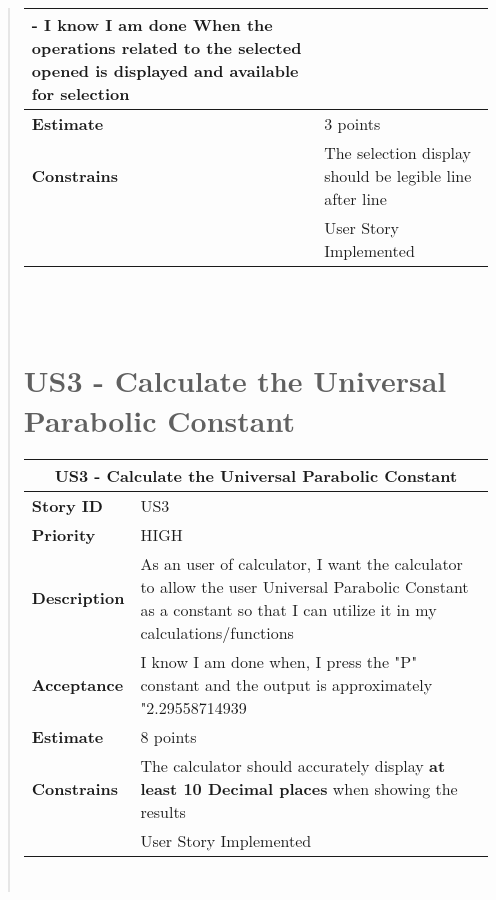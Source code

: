 \documentclass[12pt]{report}
\begin{document}
\begin{quote}
\begin{tabular}{ |p{4cm}|p{10cm}| }
                 - I know I am done When the operations related to the selected opened is displayed and available for selection 
                
                \\
                 \hline
                 \textbf{Estimate} &  3 points  \\
                 \hline
                 \textbf{Constrains}& The selection display should be legible line after line   \\
                 \hline
                 \textbf {}&User Story Implemented \\
                \hline
                \end{tabular}
            \hfill\break\\\\
    

       
              \section{US3 - Calculate the Universal Parabolic Constant}
                \begin{tabular}{ |p{4cm}|p{10cm}| }
                 \hline
                 \multicolumn{2}{|c|}{\textbf{US3 - Calculate the Universal Parabolic Constant} } \\
                 \hline
                 \textbf {Story ID}& US3  \\
                 \hline
                 \textbf{Priority} & HIGH \\
                 \hline
                 \textbf{Description}   & As an user of calculator, I want the calculator to allow the user Universal Parabolic Constant as a constant so that I can utilize it in my calculations/functions \\
                 \hline
                 \textbf{Acceptance}& 
                
                 I know I am done when, I press the "P" constant and the output is approximately "2.29558714939 \\
                 \hline
                 \textbf{Estimate} &  8 points  \\
                 \hline
                 \textbf{Constrains}& The calculator should accurately display  \textbf{at least 10 Decimal places} when showing the results  \\
                 \hline
                         \textbf {}&User Story Implemented \\
                \hline
                \end{tabular}
            \hfill\break\\
            

\end{quote}
\end{document}
